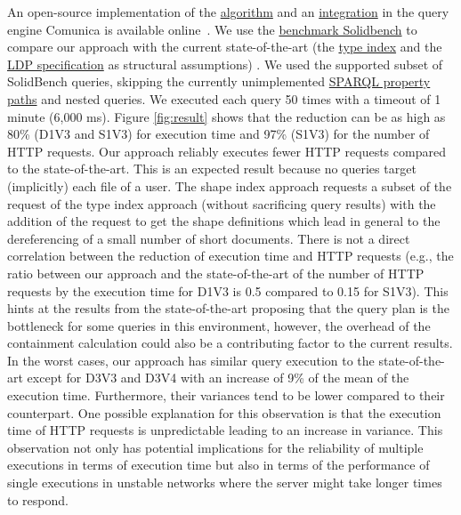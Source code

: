 An open-source implementation of the \href{https://github.com/constraintAutomaton/query-shape-detection}{algorithm} and an 
\href{https://github.com/constraintAutomaton/comunica-feature-link-traversal/tree/feature/shapeIndex}{integration} in the query engine 
Comunica \cite{taelman_iswc_resources_comunica_2018} is available online~.
We use the \href{https://github.com/SolidBench/SolidBench.js}{benchmark Solidbench} \cite{Taelman2023} to compare our approach with the current state-of-the-art (the \href{https://solid.github.io/type-indexes/}{type index} and the \href{https://www.w3.org/TR/ldp/}{LDP specification} as structural assumptions) \cite{Taelman2023}.
We used the supported subset of SolidBench queries, skipping the currently unimplemented \href{https://www.w3.org/TR/sparql11-query/#propertypaths}{SPARQL property paths} and nested queries.
We executed each query 50 times with a timeout of 1 minute (6,000 ms).
Figure \ref{fig:result} shows that the reduction can be as high as 80\% (D1V3 and S1V3) for execution time 
and 97\% (S1V3) for the number of HTTP requests.
Our approach reliably executes fewer HTTP requests compared to the state-of-the-art.
This is an expected result because no queries target (implicitly) each file of a user.
The shape index approach requests a subset of the request of the type index approach (without sacrificing query results) with the addition of the request to get the shape definitions which lead in general to the dereferencing of a small number of short documents.
There is not a direct correlation between the reduction of execution time and HTTP requests (e.g., the ratio 
between our approach and the state-of-the-art of the number of HTTP requests by the execution time for D1V3 is 0.5 compared to 0.15 for S1V3).
This hints at the results from the state-of-the-art \cite{Taelman2023} proposing that the query plan is the bottleneck for some queries in this environment,
however, the overhead of the containment calculation could also be a contributing factor to the current results.
In the worst cases, our approach  has similar query execution to the state-of-the-art except for D3V3 and D3V4 with an increase of 9\% of the mean of the execution time.
Furthermore, their variances tend to be lower compared to their counterpart. 
One possible explanation for this observation is that the execution time of HTTP requests is unpredictable \cite{hartig2016walking}
leading to an increase in variance.
This observation not only has potential implications for the reliability of multiple executions in terms of execution time
but also in terms of the performance of single executions in unstable networks where the server might take longer times to respond. 


